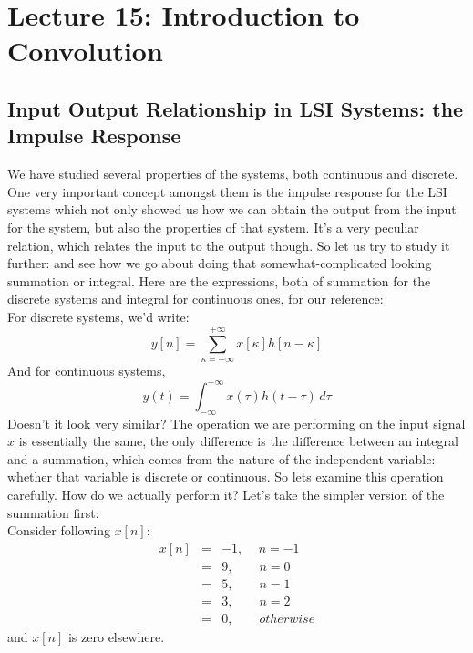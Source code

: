 \section{Lecture 15: Introduction to Convolution}



\subsection{Input Output Relationship in LSI Systems: the Impulse Response}
We have studied several properties of the systems, both continuous and discrete. One very important concept amongst them is the impulse response for the LSI systems which not only showed us how we can obtain the output from the input for the system, but also the properties of that system. It's a very peculiar relation, which relates the input to the output though. So let us try to study it further: and see how we go about doing that somewhat-complicated looking summation or integral. Here are the expressions, both of summation for the discrete systems and integral for continuous ones, for our reference:\\
For discrete systems, we'd write:
\begin{equation}
y[n]=\sum_{\kappa=-\infty}^{+\infty} x[\kappa]h[n-\kappa] \nonumber
\end{equation}
And for continuous systems,
\begin{equation}
y(t)=\int_{-\infty}^{+\infty} x(\tau)h(t-\tau)\,d\tau \nonumber
\end{equation}
Doesn't it look very similar? The operation we are performing on the input signal $x$ is essentially the same, the only difference is the difference between an integral and a summation, which comes from the nature of the independent variable: whether that variable is discrete or continuous. So lets examine this operation carefully. How do we actually perform it? Let's take the simpler version of the summation first:\\ 
Consider following $x[n]$:
\begin{eqnarray*}
x[n] &=& -1, \quad\, n=-1 \\ 
&=& 9, \quad\quad n=0\\
&=& 5, \quad\quad n=1\\
&=& 3, \quad\quad n=2\\
&=& 0, \quad\quad otherwise
\end{eqnarray*}
and $x[n]$ is zero elsewhere.
